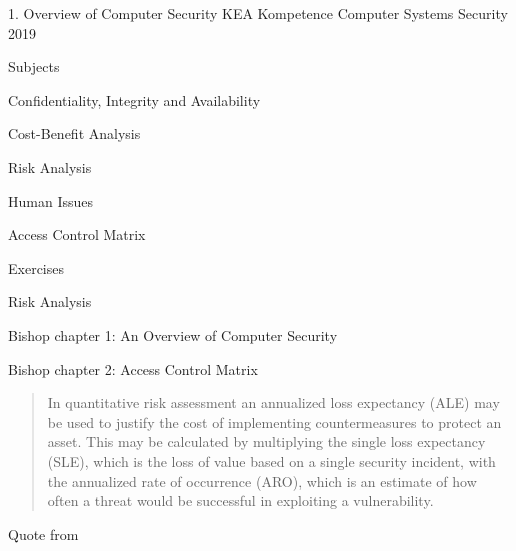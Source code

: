 \documentclass[Screen16to9,17pt]{foils}
\begin{document}
\mytitlepage
{1. Overview of Computer Security}
{KEA Kompetence Computer Systems Security 2019}



\begin{list1}
\item Subjects
\begin{list2}
\item Confidentiality, Integrity and Availability
\item Cost-Benefit Analysis
\item Risk Analysis
\item Human Issues
\item Access Control Matrix
\end{list2}
\item Exercises
\begin{list2}
\item Risk Analysis
\item
\end{list2}
\end{list1}




\begin{list1}
\item Bishop chapter 1: An Overview of Computer Security
\item Bishop chapter 2: Access Control Matrix
\end{list1}









\begin{quote}
In quantitative risk assessment an annualized loss expectancy (ALE) may be used to justify the cost of implementing countermeasures to protect an asset. This may be calculated by multiplying the single loss expectancy (SLE), which is the loss of value based on a single security incident, with the annualized rate of occurrence (ARO), which is an estimate of how often a threat would be successful in exploiting a vulnerability.
\end{quote}

Quote from 





\slidenext
\end{document}
